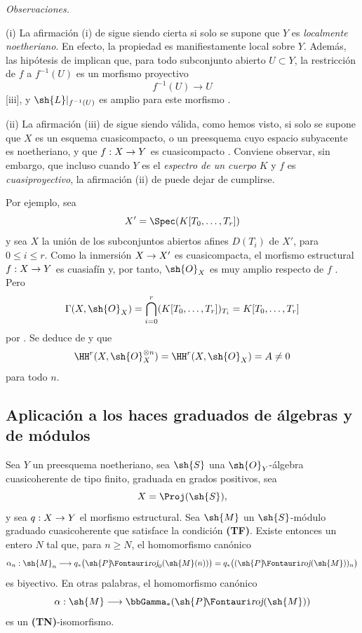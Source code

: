 \documentclass[oneside]{amsart}
\makeatletter
\renewcommand{\leq}{\leqslant}
\renewcommand{\geq}{\geqslant}
\newcommand{\ega@arrow}[2]{\mathchoice{#1}{#2}{#2}{#2}}
\renewcommand{\to}{\ega@arrow{\longrightarrow}{\rightarrow}}
\newcommand*{\ega@sheafop}[3]{\sh{#1}#2\textup{\kern-2.2pt{\Fontauri\slshape #3}}}
\newcommand*{\shProj}{\ega@sheafop{P}{}{roj}}
\newcommand{\oldpage}[2][]{{\marginnote{\normalfont\textbf{#1}~|~#2}}\ignorespaces}
\let\EGAOriginalLabel\label
\renewcommand{\label}[1]{\phantomsection\EGAOriginalLabel{#1}}
\makeatother
\begin{document}
\begin{env}[2.2.5]
\label{III.2.2.5}
\emph{Observaciones.}

(i) La afirmación (i) de  sigue siendo cierta si solo se supone que $Y$ es \emph{localmente noetheriano}.
En efecto, la propiedad es manifiestamente local sobre $Y$.
Además, las hipótesis de  implican que, para todo subconjunto abierto $U\subset Y$, la restricción de $f$ a $f^{-1}(U)$ es un morfismo proyectivo
\[
  f^{-1}(U)\longrightarrow U
\]
[iii], y $\sh{L}|_{f^{-1}(U)}$ es amplio para este morfismo .

(ii) La afirmación (iii) de  sigue siendo válida, como hemos visto, si solo se supone que $X$ es un esquema cuasicompacto, o un preesquema cuyo espacio subyacente es noetheriano, y que $f:X\to Y$ es cuasicompacto .
Conviene observar, sin embargo, que incluso cuando $Y$ es el \emph{espectro de un cuerpo} $K$ y $f$ es \emph{cuasiproyectivo}, la afirmación (ii) de  puede dejar de cumplirse.

Por ejemplo, sea
\[
  X'=\Spec(K[T_0,\ldots,T_r])
\]
y sea $X$ la unión de los subconjuntos abiertos afines $D(T_i)$ de $X'$, para $0\leq i\leq r$.
Como la inmersión $X\to X'$ es cuasicompacta, el morfismo estructural $f:X\to Y$ es cuasiafín  y, por tanto, $\sh{O}_X$ es muy amplio respecto de $f$ .
Pero
\[
  \Gamma(X,\sh{O}_X)
  =\bigcap_{i=0}^r(K[T_0,\ldots,T_r])_{T_i}
  =K[T_0,\ldots,T_r]
\]
por .
Se deduce de  y  que
\[
  \HH^r(X,\sh{O}_X^{\otimes n})
  =\HH^r(X,\sh{O}_X)
  =A\neq0
\]
para todo $n$.
\end{env}


\subsection{Aplicación a los haces graduados de álgebras y de módulos}
\label{subsection:III.2.3}

\begin{theorem}[2.3.1]
\label{III.2.3.1}
Sea $Y$ un preesquema noetheriano, sea $\sh{S}$ una $\sh{O}_Y$-álgebra cuasicoherente de tipo finito, graduada en grados positivos, sea
\[
  X=\Proj(\sh{S}),
\]
y sea $q:X\to Y$ el morfismo estructural.
Sea $\sh{M}$ un $\sh{S}$-módulo graduado cuasicoherente que satisface la condición \textup{\textbf{(TF)}}.
Existe entonces un entero $N$ tal que, para $n\geq N$, el homomorfismo canónico \textup{}
\[
  \alpha_n:\sh{M}_n
  \longrightarrow q_*\bigl(\shProj_0(\sh{M}(n))\bigr)
  =q_*\bigl((\shProj(\sh{M}))_n\bigr)
\]
\oldpage[III]{103}
es biyectivo.
En otras palabras, el homomorfismo canónico
\[
  \alpha:\sh{M}\longrightarrow\bbGamma_*(\shProj(\sh{M}))
\]
es un \textup{\textbf{(TN)}}-isomorfismo.
\end{theorem}
\end{document}

